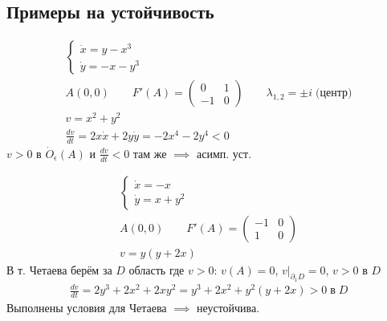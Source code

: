 \documentclass{article}
\begin{document}

\subsection{Примеры на устойчивость}
\begin{eg}
  \begin{gather*}
    \left\{\begin{aligned}
      \dot{x}=y-x^{3} \\ 
      \dot{y}=-x-y^{3}
    \end{aligned}\right. \\ 
    A(0,0) \qquad F'(A)=\begin{pmatrix}
      0 & 1 \\ 
      -1 & 0
    \end{pmatrix} \qquad \lambda_{1,2}=\pm i \; \text{(центр)} \\ 
    v=x^{2}+y^{2} \\ 
    \frac{dv}{dt}=2x\dot{x}+2y\dot{y}=-2x^{4}-2y^{4} < 0
  \end{gather*}
  $v>0$ в $\dot{O}_\epsilon(A)$ и $\frac{dv}{dt}<0$ там же $\implies$ асимп. уст.
\end{eg}
\begin{eg}
  \begin{gather*}
    \left\{\begin{aligned}
      \dot{x}=-x \\ 
      \dot{y}=x+y^{2}
    \end{aligned}\right. \\ 
    A(0,0) \qquad F'(A)=\begin{pmatrix}
      -1 & 0 \\ 
      1 & 0
    \end{pmatrix} \\ 
    v=y(y+2x)
  \end{gather*}  
  В т. Четаева берём за $D$ область где $v>0$:
  $v(A)=0$, $v \big|_{\partial_1 D}=0$, $v>0$ в $D$
  \begin{gather*}
    \frac{dv}{dt}=2y^{3}+2x^{2}+2xy^{2}=y^{3}+2x^{2}+y^{2}(y+2x)>0 \; \text{в} \;D
  \end{gather*}
  Выполнены условия для Четаева $\implies$ неустойчива.
\end{eg}
\end{document}
